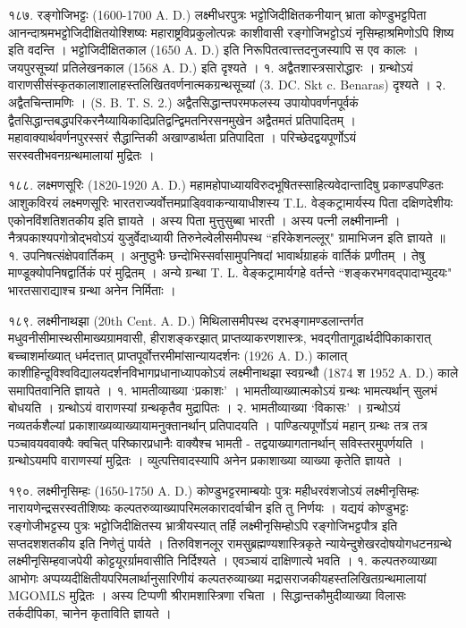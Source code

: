 १८७. रङ्गोजिभट्टः (1600-1700 A. D.)
लक्ष्मीधरपुत्रः भट्टोजिदीक्षितकनीयान् भ्राता कोण्डुभट्टपिता आनन्दाश्रमभट्टोजिदीक्षितयोश्शिष्यः महाराष्ट्रविप्रकुलोत्पन्नः काशीवासी रङ्गोजिभट्टोऽयं नृसिम्हाश्रमिणोऽपि शिष्य इति वदन्ति । भट्टोजिदीक्षितकाल (1650 A. D.) इति निरूपितत्वात्त्तदनुजस्यापि स एव कालः । जयपुरसूच्यां प्रतिलेखनकाल (1568 A. D.) इति दृश्यते ।
१. अद्वैतशास्त्रसारोद्धारः । ग्रन्थोऽयं वाराणसीसंस्कृतकालाशालाहस्तलिखितवर्णनात्मकग्रन्थसूच्यां (3. DC. Skt c. Benaras) दृश्यते ।
२. अद्वैतचिन्तामणिः । (S. B. T. S. 2.)
अद्वैतसिद्धान्तपरमफलस्य उपायोपवर्णनपूर्वकं द्वैतसिद्धान्तबद्धपरिकरनैय्यायिकादिप्रतिद्वन्द्विमतनिरसनमुखेन अद्वैतमतं प्रतिपादितम् । महावाक्यार्थवर्णनपुरस्सरं सैद्धान्तिकी अखाण्डार्थता प्रतिपादिता । परिच्छेदद्वयपूर्णोऽयं सरस्वतीभवनग्रन्थमालायां मुद्रितः ।

१८८. लक्ष्मणसूरिः (1820-1920 A. D.)
महामहोपाध्यायविरुदभूषितस्साहित्यवेदान्तादिषु प्रकाण्डपण्डितः आशुकविरयं लक्ष्मणसूरिः भारतराज्यर्वोत्तमप्राड्विवाकन्यायाधीशस्य T.L. वेङ्कट्रामार्यस्य पिता दक्षिणदेशीयः एकोनविंशतिशतकीय इति ज्ञायते । अस्य पिता मुत्तुसुब्बा भारती । अस्य पत्नी लक्ष्मीनाम्नी । नैत्रपकाश्यपगोत्रोद्भवोऽयं युजुर्वेदाध्यायी तिरुनेल्वेलीसमीपस्थ ``हरिकेशनल्लूर्" ग्रामाभिजन इति ज्ञायते ॥
१. उपनिषत्संक्षेपवार्तिकम् । अनुष्ठुभैः छन्दोभिस्सर्वासामुपनिषदां भावार्थग्राहकं वार्तिकं प्रणीतम् । तेषु माण्डूक्योपनिषद्वार्तिकं परं मुद्रितम् । अन्ये ग्रन्था T. L. वेङ्कट्रामार्यगहे वर्तन्ते ``शङ्करभगवद्पादाभ्युदयः" भारतसाराद्याश्च ग्रन्था अनेन निर्मिताः ।

१८९. लक्ष्मीनाथझा (20th Cent. A. D.)
मिथिलासमीपस्थ दरभङ्गामण्डलान्तर्गत मधुवनीसीमास्थसीमाख्यग्रामवासी, हीराशङ्करझात् प्राप्तव्याकरणशास्त्रः, भवद्गीतागूढार्थदीपिकाकारात् बच्चाशर्माख्यात् धर्मदत्तात् प्राप्तपूर्वोत्तरमीमांसान्यायदर्शनः (1926 A. D.) कालात् काशीहिन्दूविश्वविद्यालयदर्शनविभागप्रधानाध्यापकोऽयं लक्ष्मीनाथझा स्वग्रन्थौ (1874 श 1952 A. D.) काले समापितवानिति ज्ञायते ।
१. भामतीव्याख्या `प्रकाशः' । भामतीव्याख्यात्मकोऽयं ग्रन्थः भामत्यर्थान् सुलभं बोधयति । ग्रन्थोऽयं वाराणस्यां ग्रन्थकृतैव मुद्रापितः ।
२. भामतीव्याख्या `विकासः' । ग्रन्थोऽयं नव्यतर्कशैल्यां प्रकाशाख्यव्याख्यायामनुक्तानर्थान् प्रतिपादयति । पाण्डित्यपूर्णोऽयं महान् ग्रन्थः तत्र तत्र पञ्चावयववाक्यैः क्वचित् परिष्कारप्रधानैः वाक्यैश्च भामती - तद्वयाख्यागतानर्थान् सविस्तरमुपर्णयति । ग्रन्थोऽयमपि वाराणस्यां मुद्रितः । व्युत्पत्तिवादस्यापि अनेन प्रकाशाख्या व्याख्या कृतेति ज्ञायते ।

१९०. लक्ष्मीनृसिम्हः (1650-1750 A. D.)
कोण्डुभट्टरमाम्बयोः पुत्रः महीधरवंशजोऽयं लक्ष्मीनृसिम्हः नारायणेन्द्रसरस्वतीशिष्यः कल्पतरुव्याख्यापरिमलकारादर्वाचीन इति तु निर्णयः । यद्ययं कोण्डुभट्टः रङ्गोजीभट्टस्य पुत्रः भट्टोजिदीक्षितस्य भ्रात्रीयस्यात् तर्हि लक्ष्मीनृसिम्होऽपि रङ्गोजिभट्टपौत्र इति सप्तदशशतकीय इति निणेतुं पार्यते । तिरुविशनलूर रामसुब्रह्मण्यशास्त्रिकृते न्यायेन्दुशेखरदोषयोगधटनग्रन्थे लक्ष्मीनृसिम्हवाजपेयी कोट्टयूरर्ग्रामवासीति निर्दिश्यते । एवञ्चायं दाक्षिणात्ये भवति ।
१. कल्पतरुव्याख्या आभोगः
अप्पय्यदीक्षितीयपरिमलार्थानुसारिणीयं कल्पतरुव्याख्या मद्रासराजकीयहस्तलिखितग्रन्थमालायां MGOMLS मुद्रितः । अस्य टिप्पणी श्रीरामशास्त्रिणा रचिता । सिद्धान्तकौमुदीव्याख्या विलासः तर्कदीपिका, चानेन कृताविति ज्ञायते ।

